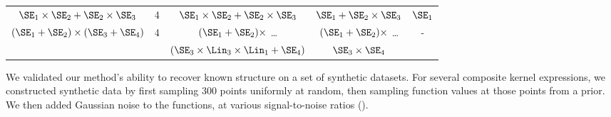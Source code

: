 \begin{table}[ht!]
\begin{center}
{\begin{tabular}{c c | c c c}
                                              \\
$\SE_1 \times \SE_2 + \SE_2 \times \SE_3$ & 4 
                                              & $\SE_1 \times \SE_2 + \SE_2 \times \SE_3$
                                              & $\SE_1 + \SE_2 \times \SE_3$
                                              & $\SE_1$
                                              \\
\multirow{2}{*}{ $(\SE_1 + \SE_2) \times (\SE_3 + \SE_4)$ } & \multirow{2}{*}{4}
                                              & $(\SE_1 + \SE_2) \times$ \dots
                                              & $(\SE_1 + \SE_2) \times$ \dots 
                                              & \multirow{2}{*}{-}
                                              \\
                                          &    & $(\SE_3\times\Lin_3\times\Lin_1 + \SE_4)$ & $\SE_3 \times \SE_4$ &
\end{tabular}
}
\end{center}
\end{table}

%

We validated our method's ability to recover known structure on a set of synthetic datasets.
For several composite kernel expressions, we constructed synthetic data by first sampling 300 points uniformly at random, then sampling function values at those points from a \gp{} prior.
We then added \iid Gaussian noise to the functions, at various signal-to-noise ratios (\SNR{}).

%
%


